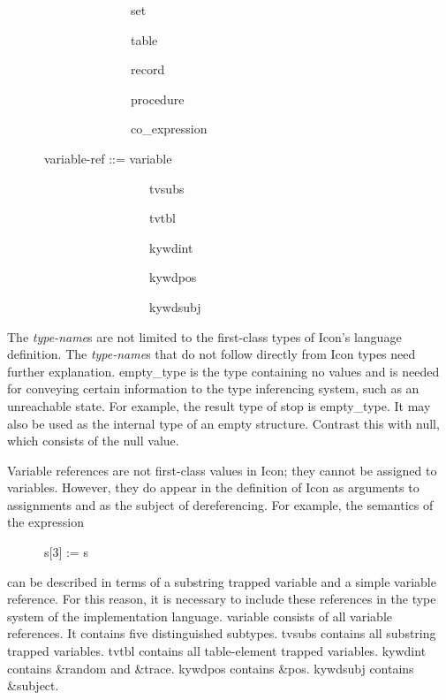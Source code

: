 {\ttfamily\mdseries
\ \ \ \ \ \ \ \ \ \ \ \ \ \ \ \ \ \ \ \ set {\textbar}}

{\ttfamily\mdseries
\ \ \ \ \ \ \ \ \ \ \ \ \ \ \ \ \ \ \ \ table {\textbar}}

{\ttfamily\mdseries
\ \ \ \ \ \ \ \ \ \ \ \ \ \ \ \ \ \ \ \ record {\textbar}}

{\ttfamily\mdseries
\ \ \ \ \ \ \ \ \ \ \ \ \ \ \ \ \ \ \ \ procedure {\textbar}}

{\ttfamily\mdseries
\ \ \ \ \ \ \ \ \ \ \ \ \ \ \ \ \ \ \ \ co\_expression}

{\ttfamily\mdseries
\ \ \ \ \ \ variable-ref ::= variable {\textbar}}

{\ttfamily\mdseries
\ \ \ \ \ \ \ \ \ \ \ \ \ \ \ \ \ \ \ \ \ \ \ tvsubs {\textbar}}

{\ttfamily\mdseries
\ \ \ \ \ \ \ \ \ \ \ \ \ \ \ \ \ \ \ \ \ \ \ tvtbl {\textbar}}

{\ttfamily\mdseries
\ \ \ \ \ \ \ \ \ \ \ \ \ \ \ \ \ \ \ \ \ \ \ kywdint {\textbar}}

{\ttfamily\mdseries
\ \ \ \ \ \ \ \ \ \ \ \ \ \ \ \ \ \ \ \ \ \ \ kywdpos {\textbar}}

{\ttfamily\mdseries
\ \ \ \ \ \ \ \ \ \ \ \ \ \ \ \ \ \ \ \ \ \ \ kywdsubj}


The \textit{type-name}s are not limited to the first-class types of
Icon's language definition. The \textit{type-name}s that do not follow
directly from Icon types need further explanation. empty\_type is the
type containing no values and is needed for conveying certain
information to the type inferencing system, such as an unreachable
state. For example, the result type of stop is empty\_type. It may
also be used as the internal type of an empty structure. Contrast this
with null, which consists of the null value.

Variable references are not first-class values in Icon; they cannot be
assigned to variables. However, they do appear in the definition of
Icon as arguments to assignments and as the subject of
dereferencing. For example, the semantics of the expression

{\ttfamily\mdseries
\ \ \ \ \ \ s[3] := s}

\noindent can be described in terms of a substring trapped variable
and a simple variable reference. For this reason, it is necessary to
include these references in the type system of the implementation
language. variable consists of all variable references. It contains
five distinguished subtypes. tvsubs contains all substring trapped
variables. tvtbl contains all table-element trapped variables. kywdint
contains \&random and \&trace. kywdpos contains \&pos. kywdsubj
contains \&subject.

